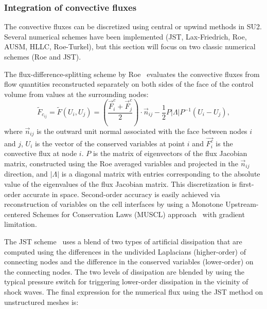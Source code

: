 \subsubsection{Integration of convective fluxes}

The convective fluxes can be discretized using central or upwind methods in SU2. Several numerical schemes have been implemented (JST, Lax-Friedrich, Roe, AUSM, HLLC, Roe-Turkel), but this section will focus on two classic numerical schemes (Roe and JST).

The flux-difference-splitting scheme by Roe~\cite{roe81} evaluates the convective fluxes from flow quantities reconstructed separately on both sides of the face of the control volume from values at the surrounding nodes:
\begin{equation} \label{eq:roe}
\tilde{F}_{c_{ij}} = \tilde{F}(U_i, U_j) = \left(\frac{\vec{F}^c_i +\vec{F}^c_j}{2}\right)\cdot \vec{n}_{ij} - \frac{1}{2} P|\Lambda|P^{-1}(U_i - U_j), 
\end{equation}
where $\vec{n}_{ij}$ is the outward unit normal associated with the face between nodes $i$ and $j$, $U_i$ is the vector of the conserved variables at point $i$ and $\vec{F^c_i}$ is the convective flux at node $i$. $P$ is the matrix of eigenvectors of the flux Jacobian matrix, constructed using the Roe averaged variables and projected in the $\vec{n}_{ij}$ direction, and $|\Lambda|$ is a diagonal matrix with entries corresponding to the absolute value of the eigenvalues of the flux Jacobian matrix. This discretization is first-order accurate in space. Second-order accuracy is easily achieved via reconstruction of variables on the cell interfaces by using a Monotone Upstream-centered Schemes for Conservation Laws (MUSCL) approach~\cite{Leer1979} with gradient limitation.


The JST scheme~\cite{jameson81} uses a blend of two types of artificial dissipation that are computed using the differences in the undivided Laplacians (higher-order) of connecting nodes and the difference in the conserved variables (lower-order) on the connecting nodes. The two levels of dissipation are blended by using the typical pressure switch for triggering lower-order dissipation in the vicinity of shock waves. The final expression for the numerical flux using the JST method on unstructured meshes is:

